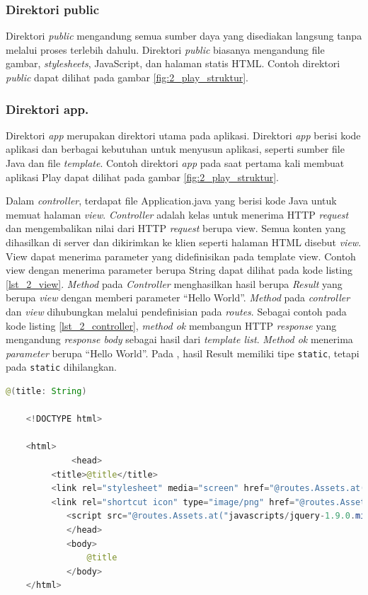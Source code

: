 \subsubsection{Direktori public}
Direktori \textit{public} mengandung semua sumber daya yang disediakan langsung tanpa melalui proses terlebih dahulu. Direktori \textit{public} biasanya mengandung file gambar, \textit{stylesheets}, JavaScript, dan halaman statis HTML. Contoh direktori \textit{public} dapat dilihat pada gambar \ref{fig:2_play_struktur}.
%

\subsubsection{Direktori app.}
Direktori \textit{app} merupakan direktori utama pada aplikasi. Direktori \textit{app} berisi kode aplikasi dan berbagai kebutuhan untuk menyusun aplikasi, seperti sumber file Java dan file \textit{template}. Contoh direktori \textit{app} pada saat pertama kali membuat aplikasi Play dapat dilihat pada gambar \ref{fig:2_play_struktur}. 

Dalam \textit{controller}, terdapat file Application.java yang berisi kode Java untuk memuat halaman \textit{view}. \textit{Controller} adalah kelas untuk menerima HTTP \textit{request} dan mengembalikan nilai dari HTTP \textit{request} berupa view. Semua konten yang dihasilkan di server dan dikirimkan ke klien seperti halaman HTML disebut \textit{view}. View dapat menerima parameter yang didefinisikan pada template view. Contoh view dengan menerima parameter berupa String dapat dilihat pada kode listing \ref{lst_2_view}. \textit{Method} pada \textit{Controller} menghasilkan hasil berupa \textit{Result} yang berupa \textit{view} dengan memberi parameter ``Hello World''. \textit{Method} pada \textit{controller} dan \textit{view} dihubungkan melalui pendefinisian pada \textit{routes}. Sebagai contoh pada kode listing \ref{lst_2_controller}, \textit{method ok} membangun HTTP \textit{response} yang mengandung \textit{response body} sebagai hasil dari \textit{template list}. \textit{Method ok} menerima \textit{parameter} berupa ``Hello World''. Pada \cite{playforjava}, hasil Result memiliki tipe \verb!static!, tetapi pada  \verb!static! dihilangkan.

\begin{lstlisting}[caption=Contoh View,label = {lst_2_view},language=Java]
@(title: String)

	<!DOCTYPE html>

	<html>
    		 <head>
       	 <title>@title</title>
       	 <link rel="stylesheet" media="screen" href="@routes.Assets.at("stylesheets/main.css")">
       	 <link rel="shortcut icon" type="image/png" href="@routes.Assets.at("images/favicon.png")">
        	<script src="@routes.Assets.at("javascripts/jquery-1.9.0.min.js")" type="text/javascript"></script>
    		</head>
    		<body>
        		@title
    		</body>
	</html>
\end{lstlisting}



